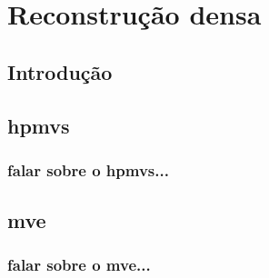 \chapter{Reconstrução densa}\label{sec:denserecon}
\section {Introdução}

\section {hpmvs}

\subsection {falar sobre o hpmvs...}

\section {mve}

\subsection {falar sobre o mve...}

